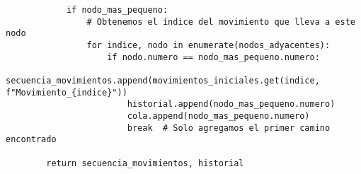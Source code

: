 \begin{lstlisting}
            if nodo_mas_pequeno:
                # Obtenemos el índice del movimiento que lleva a este nodo
                for indice, nodo in enumerate(nodos_adyacentes):
                    if nodo.numero == nodo_mas_pequeno.numero:
                        secuencia_movimientos.append(movimientos_iniciales.get(indice, f"Movimiento_{indice}"))
                        historial.append(nodo_mas_pequeno.numero)
                        cola.append(nodo_mas_pequeno.numero)
                        break  # Solo agregamos el primer camino encontrado
        
        return secuencia_movimientos, historial   

\end{lstlisting}